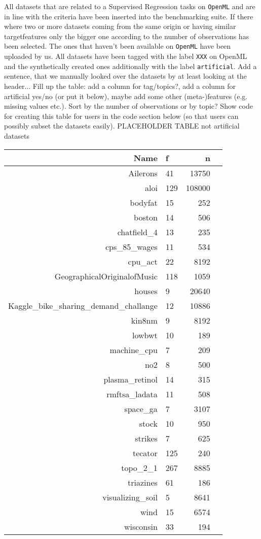 \documentclass[a4paper]{article}
\begin{document}
All datasets that are related to a Supervised Regression tasks on \texttt{OpenML} and are in line with the criteria have been inserted into the benchmarking suite. If there where two or more datasets coming from the same origin or having similar targetfeatures only the bigger one according to the number of observations has been selected. The ones that haven't been available on \texttt{OpenML} have been uploaded by us. All datasets have been tagged with the label \texttt{XXX} on OpenML and the synthetically created ones additionally with the label \texttt{artificial}. 
\color{red} Add a sentence, that we manually looked over the datasets by at least looking at the header... \color{black}
\color{red} Fill up the table: add a column for tag/topics?, add a column for artificial yes/no (or put it below), maybe add some other (meta-)features (e.g. missing values etc.). Sort by the number of observations or by topic? Show code for creating this table for users in the code section below (so that users can possibly subset the datasets easily). \color{black} 
\newline 
PLACEHOLDER TABLE not artificial datasets
\begin{table}[ht]
	\centering
	\begin{tabular}{rlrr}
		\hline
		 Name & f & n \\ 
		\hline
		 Ailerons &  41 & 13750 \\ 
		 aloi & 129 & 108000 \\ 
		 bodyfat &  15 & 252 \\ 
		 boston &  14 & 506 \\ 
		 chatfield\_4 &  13 & 235 \\ 
		 cps\_85\_wages &  11 & 534 \\ 
		 cpu\_act &  22 & 8192 \\ 
		 GeographicalOriginalofMusic & 118 & 1059 \\ 
		 houses &   9 & 20640 \\ 
		 Kaggle\_bike\_sharing\_demand\_challange &  12 & 10886 \\ 
		 kin8nm &   9 & 8192 \\ 
		 lowbwt &  10 & 189 \\ 
		 machine\_cpu &   7 & 209 \\ 
		 no2 &   8 & 500 \\ 
		 plasma\_retinol &  14 & 315 \\ 
		 rmftsa\_ladata &  11 & 508 \\ 
		 space\_ga &   7 & 3107 \\ 
		 stock &  10 & 950 \\ 
		 strikes &   7 & 625 \\ 
		 tecator & 125 & 240 \\ 
		 topo\_2\_1 & 267 & 8885 \\ 
		 triazines &  61 & 186 \\ 
		 visualizing\_soil &   5 & 8641 \\ 
		 wind &  15 & 6574 \\ 
		 wisconsin &  33 & 194 \\ 
		\hline
	\end{tabular}
\end{table}
\end{document}
